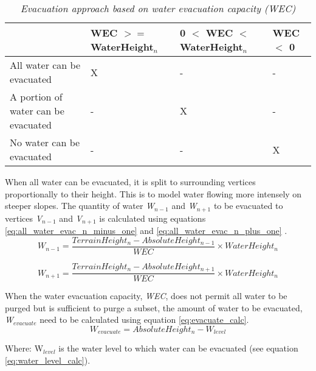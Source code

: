\begin{table}[h]
  \centering
	    \begin{tabular}{|p{6cm}|p{3cm}|p{3cm}|p{3cm}|}
		\hline	
  	     &  WEC $>=$ WaterHeight$_{n}$ & 0 $<$ WEC $<$ WaterHeight$_{n}$ & WEC $<$ 0 \\
  	    \hline	
  	    All water can be evacuated & X & - & - \\
		\hline
  	    A portion of water can be evacuated & - & X & - \\
		\hline
  	    No water can be evacuated & - & - & X \\
		\hline
		\end{tabular}
		\caption{\textit{Evacuation approach based on water evacuation capacity (\textit{WEC})}}
	  \label{tab:scenario_based_on_wec}
\end{table}

When all water can be evacuated, it is split to surrounding vertices proportionally to their height. This is to model water flowing more intensely on steeper slopes. The quantity of water \textit{W$_{n-1}$} and \textit{W$_{n+1}$} to be evacuated to vertices \textit{V$_{n-1}$} and \textit{V$_{n+1}$} is calculated using equations \ref{eq:all_water_evac_n_minus_one} and \ref{eq:all_water_evac_n_plus_one} . \\

\begin{equation}\label{eq:all_water_evac_n_minus_one}
W_{n-1} = \frac{TerrainHeight_{n} - AbsoluteHeight_{n-1}}{WEC} \times WaterHeight_{n}
\end{equation}

\begin{equation}\label{eq:all_water_evac_n_plus_one}
W_{n+1} = \frac{TerrainHeight_{n} - AbsoluteHeight_{n+1}}{WEC} \times WaterHeight_{n}
\end{equation}

When the water evacuation capacity, \textit{WEC}, does not permit all water to be purged but is sufficient to purge a subset, the amount of water to be evacuated, \textit{W$_{evacuate}$} need to be calculated using equation \ref{eq:evacuate_calc}. \\

\begin{equation}\label{eq:evacuate_calc}
	W_{evacuate} = AbsoluteHeight_{n} - W_{level}
\end{equation}

Where: W$_{level}$ is the water level to which water can be evacuated (see equation \ref{eq:water_level_calc}).

